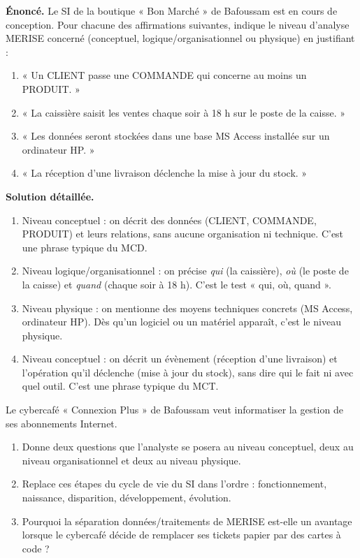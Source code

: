 \documentclass[11pt]{article}
\newcommand{\cle}[1]{{\popxbold\color{popdark}#1}}
\begin{document}
\begin{exoresolu}
\textbf{Énoncé.} Le SI de la boutique « Bon Marché » de Bafoussam est en cours de conception. Pour chacune des affirmations suivantes, indique le niveau d'analyse MERISE concerné (conceptuel, logique/organisationnel ou physique) en justifiant :
\begin{enumerate}
\item « Un CLIENT passe une COMMANDE qui concerne au moins un PRODUIT. »
\item « La caissière saisit les ventes chaque soir à 18 h sur le poste de la caisse. »
\item « Les données seront stockées dans une base MS Access installée sur un ordinateur HP. »
\item « La réception d'une livraison déclenche la mise à jour du stock. »
\end{enumerate}
\tcblower
\textbf{Solution détaillée.}
\begin{enumerate}
\item Niveau \cle{conceptuel} : on décrit des données (CLIENT, COMMANDE, PRODUIT) et leurs relations, sans aucune organisation ni technique. C'est une phrase typique du MCD.
\item Niveau \cle{logique/organisationnel} : on précise \emph{qui} (la caissière), \emph{où} (le poste de la caisse) et \emph{quand} (chaque soir à 18 h). C'est le test « qui, où, quand ».
\item Niveau \cle{physique} : on mentionne des moyens techniques concrets (MS Access, ordinateur HP). Dès qu'un logiciel ou un matériel apparaît, c'est le niveau physique.
\item Niveau \cle{conceptuel} : on décrit un évènement (réception d'une livraison) et l'opération qu'il déclenche (mise à jour du stock), sans dire qui le fait ni avec quel outil. C'est une phrase typique du MCT.
\end{enumerate}
\end{exoresolu}

\begin{exercice}
Le cybercafé « Connexion Plus » de Bafoussam veut informatiser la gestion de ses abonnements Internet.
\begin{enumerate}
\item Donne deux questions que l'analyste se posera au niveau conceptuel, deux au niveau organisationnel et deux au niveau physique.
\item Replace ces étapes du cycle de vie du SI dans l'ordre : fonctionnement, naissance, disparition, développement, évolution.
\item Pourquoi la séparation données/traitements de MERISE est-elle un avantage lorsque le cybercafé décide de remplacer ses tickets papier par des cartes à code ?
\end{enumerate}
\end{exercice}
\end{document}
